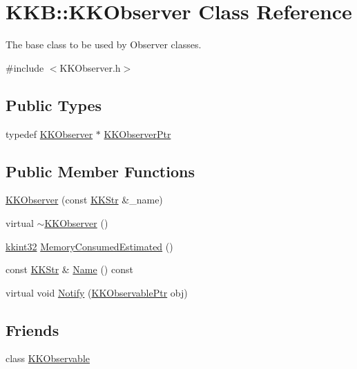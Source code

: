 \hypertarget{class_k_k_b_1_1_k_k_observer}{}\section{K\+KB\+:\+:K\+K\+Observer Class Reference}
\label{class_k_k_b_1_1_k_k_observer}


The base class to be used by Observer classes.  




{\ttfamily \#include $<$K\+K\+Observer.\+h$>$}

\subsection*{Public Types}
\begin{DoxyCompactItemize}
\item 
typedef \hyperlink{class_k_k_b_1_1_k_k_observer}{K\+K\+Observer} $\ast$ \hyperlink{class_k_k_b_1_1_k_k_observer_a68ab7a7c923a7f43d39542cd5264f231}{K\+K\+Observer\+Ptr}
\end{DoxyCompactItemize}
\subsection*{Public Member Functions}
\begin{DoxyCompactItemize}
\item 
\hyperlink{class_k_k_b_1_1_k_k_observer_aca8156ee354c4275e3650f234620c417}{K\+K\+Observer} (const \hyperlink{class_k_k_b_1_1_k_k_str}{K\+K\+Str} \&\+\_\+name)
\item 
virtual \hyperlink{class_k_k_b_1_1_k_k_observer_a4cbcf4b87593c8ea9108407eafcffd95}{$\sim$\+K\+K\+Observer} ()
\item 
\hyperlink{namespace_k_k_b_a8fa4952cc84fda1de4bec1fbdd8d5b1b}{kkint32} \hyperlink{class_k_k_b_1_1_k_k_observer_a74c14088dc3123923addb51a21f01548}{Memory\+Consumed\+Estimated} ()
\item 
const \hyperlink{class_k_k_b_1_1_k_k_str}{K\+K\+Str} \& \hyperlink{class_k_k_b_1_1_k_k_observer_a1ee43dac59a71e131aa453989091c999}{Name} () const 
\item 
virtual void \hyperlink{class_k_k_b_1_1_k_k_observer_aa4a1765b0120bf4a2c6c92bfe917b35b}{Notify} (\hyperlink{namespace_k_k_b_ad2874a3aec87b033137ef07aef832c93}{K\+K\+Observable\+Ptr} obj)
\end{DoxyCompactItemize}
\subsection*{Friends}
\begin{DoxyCompactItemize}
\item 
class \hyperlink{class_k_k_b_1_1_k_k_observer_a7f04de4db416537cde0a4ae0ac98c529}{K\+K\+Observable}
\end{DoxyCompactItemize}


